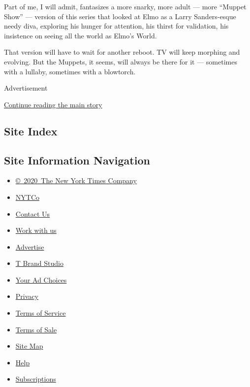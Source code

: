 Part of me, I will admit, fantasizes a more snarky, more adult --- more
``Muppet Show'' --- version of this series that looked at Elmo as a
Larry Sanders-esque needy diva, exploring his hunger for attention, his
thirst for validation, his insistence on seeing all the world as Elmo's
World.

That version will have to wait for another reboot. TV will keep morphing
and evolving. But the Muppets, it seems, will always be there for it ---
sometimes with a lullaby, sometimes with a blowtorch.

Advertisement

\protect\hyperlink{after-bottom}{Continue reading the main story}

\hypertarget{site-index}{%
\subsection{Site Index}\label{site-index}}

\hypertarget{site-information-navigation}{%
\subsection{Site Information
Navigation}\label{site-information-navigation}}

\begin{itemize}
\tightlist
\item
  \href{https://help.nytimes.com/hc/en-us/articles/115014792127-Copyright-notice}{©~2020~The
  New York Times Company}
\end{itemize}

\begin{itemize}
\tightlist
\item
  \href{https://www.nytco.com/}{NYTCo}
\item
  \href{https://help.nytimes.com/hc/en-us/articles/115015385887-Contact-Us}{Contact
  Us}
\item
  \href{https://www.nytco.com/careers/}{Work with us}
\item
  \href{https://nytmediakit.com/}{Advertise}
\item
  \href{http://www.tbrandstudio.com/}{T Brand Studio}
\item
  \href{https://www.nytimes.com/privacy/cookie-policy\#how-do-i-manage-trackers}{Your
  Ad Choices}
\item
  \href{https://www.nytimes.com/privacy}{Privacy}
\item
  \href{https://help.nytimes.com/hc/en-us/articles/115014893428-Terms-of-service}{Terms
  of Service}
\item
  \href{https://help.nytimes.com/hc/en-us/articles/115014893968-Terms-of-sale}{Terms
  of Sale}
\item
  \href{https://spiderbites.nytimes.com}{Site Map}
\item
  \href{https://help.nytimes.com/hc/en-us}{Help}
\item
  \href{https://www.nytimes.com/subscription?campaignId=37WXW}{Subscriptions}
\end{itemize}
